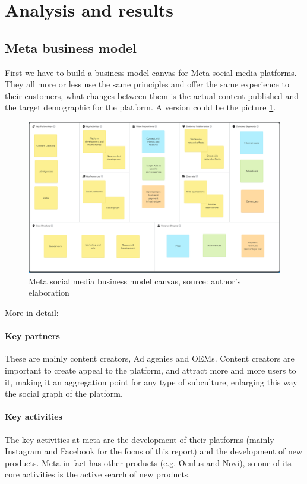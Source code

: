 \section{Analysis and results}\label{sec:analysis}
\subsection{Meta business model}
First we have to build a business model canvas for Meta social media
platforms. They all more or less use the same principles and offer the
same experience to their customers, what changes between them is the
actual content published and the target demographic for the platform.
A version could be the picture \ref{fig:fbcanvas}.

\begin{figure}[ht]
  \centering
  \includegraphics[width=.8\textwidth]{images/fbcanvas.png}
  \caption{Meta social media business model canvas, source: author's
    elaboration}
  \label{fig:fbcanvas}
\end{figure}

More in detail:
\paragraph{Key partners}
These are mainly content creators, Ad agenies and OEMs. Content
creators are important to create appeal to the platform, and attract
more and more users to it, making it an aggregation point for any type
of subculture, enlarging this way the social graph of the platform.

\paragraph{Key activities}
The key activities at meta are the development of their platforms
(mainly Instagram and Facebook for the focus of this report) and the
development of new products. Meta in fact has other products
(e.g. Oculus and Novi), so one of its core activities is the active
search of new products.

